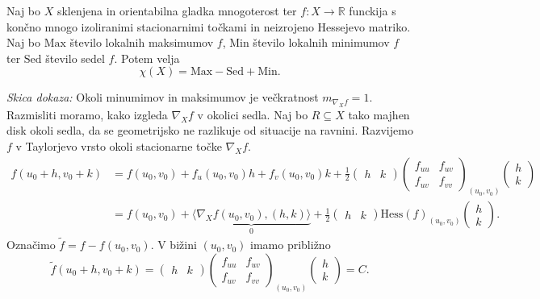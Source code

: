 \begin{izrek}
\label{izr_formula_stacionarnih_tock}
Naj bo $X$ sklenjena in orientabilna gladka mnogoterost ter $f: X \to  \mathbb{R}$ funckija s končno mnogo izoliranimi stacionarnimi točkami in neizrojeno Hessejevo matriko.
Naj bo $\text{Max}$ število lokalnih maksimumov $f$, $\text{Min}$ število lokalnih minimumov $f$ ter $\text{Sed}$ število sedel $f$. Potem velja \begin{equation*}
\chi(X) = \text{Max} - \text{Sed} + \text{Min}.
\end{equation*}  
\end{izrek}
\noindent
{\em Skica dokaza:\/}
Okoli minumimov in maksimumov je večkratnost $m_{\nabla_X f} = 1$. Razmisliti moramo, kako izgleda $\nabla_X f$ v okolici sedla.
Naj bo $R \subseteq X$ tako majhen disk okoli sedla, da se geometrijsko ne razlikuje od situacije na ravnini. Razvijemo $f$ v Taylorjevo vrsto okoli stacionarne točke $\nabla_X f$. \begin{align*}
f(u_0 + h, v_0 + k) &= f(u_0 ,v_0) + f_u(u_0, v_0)h + f_v(u_0, v_0)k + \frac{1}{2} \begin{pmatrix}
  h & k 
\end{pmatrix}
\begin{pmatrix}
  f_{uu} & f_{uv} \\
  f_{uv} & f_{vv}
\end{pmatrix}_{(u_0, v_0)}  
\begin{pmatrix}
  h \\
  k 
\end{pmatrix} \\
&= f(u_0, v_0) + \underbrace{\langle \nabla_X f (u_0, v_0), (h, k) \rangle}_0 +  \frac{1}{2} \begin{pmatrix}
    h & k 
  \end{pmatrix}
  \text{Hess}(f)_{(u_0, v_0)}  
  \begin{pmatrix}
    h \\
    k 
  \end{pmatrix}.\end{align*}  
Označimo $\tilde{f} = f - f(u_0, v_0).$ V bižini $(u_0, v_0)$ imamo približno \begin{equation*}
\tilde{f}(u_0 + h, v_0 + k) = \begin{pmatrix}
    h & k 
  \end{pmatrix}
  \begin{pmatrix}
    f_{uu} & f_{uv} \\
    f_{uv} & f_{vv}
  \end{pmatrix}_{(u_0, v_0)}  
  \begin{pmatrix}
    h \\
    k 
  \end{pmatrix} = C.
\end{equation*}  
